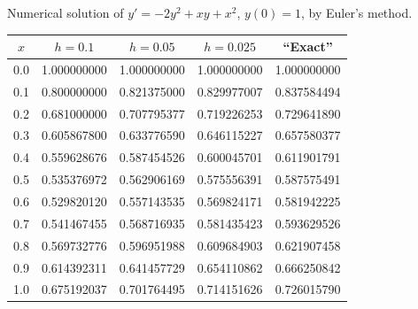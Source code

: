 \begin{examplesolution}
\begin{newtable}
  \label{table:3.1.3} Numerical solution of $y'=-2y^{2}+xy+x^{2}$, $y(0)=1$, by Euler's method.
  \begin{center}
    \begin{tabular}{|c|r|r|r|r|}
      \hline
      \multicolumn{1}{|c|}{$x$} & \multicolumn{1}{|c|}{$h=0.1$} & \multicolumn{1}{|c|}{$h=0.05$} & \multicolumn{1}{|c|}{$h=0.025$} & \multicolumn{1}{|c|}{``Exact''} \\
      \hline
      0.0                       & 1.000000000                   & 1.000000000                    & 1.000000000                     & 1.000000000                     \\
      0.1                       & 0.800000000                   & 0.821375000                    & 0.829977007                     & 0.837584494                     \\
      0.2                       & 0.681000000                   & 0.707795377                    & 0.719226253                     & 0.729641890                     \\
      0.3                       & 0.605867800                   & 0.633776590                    & 0.646115227                     & 0.657580377                     \\
      0.4                       & 0.559628676                   & 0.587454526                    & 0.600045701                     & 0.611901791                     \\
      0.5                       & 0.535376972                   & 0.562906169                    & 0.575556391                     & 0.587575491                     \\
      0.6                       & 0.529820120                   & 0.557143535                    & 0.569824171                     & 0.581942225                     \\
      0.7                       & 0.541467455                   & 0.568716935                    & 0.581435423                     & 0.593629526                     \\
      0.8                       & 0.569732776                   & 0.596951988                    & 0.609684903                     & 0.621907458                     \\
      0.9                       & 0.614392311                   & 0.641457729                    & 0.654110862                     & 0.666250842                     \\
      1.0                       & 0.675192037                   & 0.701764495                    & 0.714151626                     & 0.726015790                     \\
      \hline
    \end{tabular}
  \end{center}
\end{newtable}


\end{examplesolution}
